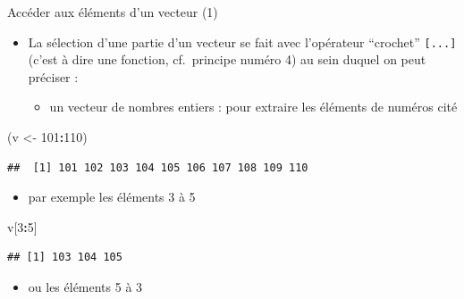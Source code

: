 \documentclass[
  ignorenonframetext,
]{beamer}
\newenvironment{Shaded}{\begin{snugshade}}{\end{snugshade}}
\newcommand{\DecValTok}[1]{\textcolor[rgb]{0.00,0.00,0.81}{#1}}
\newcommand{\NormalTok}[1]{#1}
\newcommand{\OtherTok}[1]{\textcolor[rgb]{0.56,0.35,0.01}{#1}}
\newcommand{\SpecialCharTok}[1]{\textcolor[rgb]{0.81,0.36,0.00}{\textbf{#1}}}
\providecommand{\tightlist}{%
  \setlength{\itemsep}{0pt}\setlength{\parskip}{0pt}}
\begin{document}
\begin{frame}[fragile]{Accéder aux éléments d'un vecteur (1)}
\protect\hypertarget{accuxe9der-aux-uxe9luxe9ments-dun-vecteur-1}{}
\begin{itemize}
\tightlist
\item
  La sélection d'une partie d'un vecteur se fait avec l'opérateur
  ``crochet'' \texttt{{[}...{]}} (c'est à dire une fonction,
  cf.~principe numéro 4) au sein duquel on peut préciser :

  \begin{itemize}
  \tightlist
  \item
    un vecteur de nombres entiers : pour extraire les éléments de
    numéros cité
  \end{itemize}
\end{itemize}

\tiny

\begin{Shaded}
\begin{Highlighting}[]
\NormalTok{(v }\OtherTok{\textless{}{-}} \DecValTok{101}\SpecialCharTok{:}\DecValTok{110}\NormalTok{)}
\end{Highlighting}
\end{Shaded}

\begin{verbatim}
##  [1] 101 102 103 104 105 106 107 108 109 110
\end{verbatim}

\normalsize

\begin{itemize}
\tightlist
\item
  par exemple les éléments 3 à 5
\end{itemize}

\tiny

\begin{Shaded}
\begin{Highlighting}[]
\NormalTok{v[}\DecValTok{3}\SpecialCharTok{:}\DecValTok{5}\NormalTok{]}
\end{Highlighting}
\end{Shaded}

\begin{verbatim}
## [1] 103 104 105
\end{verbatim}

\normalsize

\begin{itemize}
\tightlist
\item
  ou les éléments 5 à 3
\end{itemize}


\end{frame}
\end{document}
